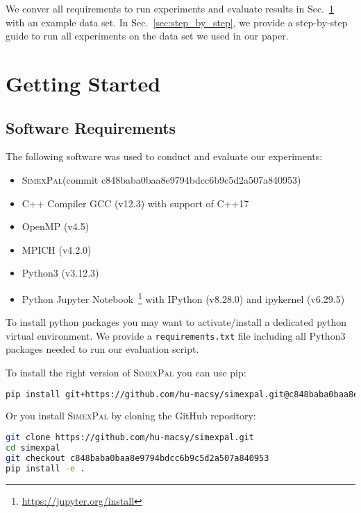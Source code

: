 \documentclass[11pt, a4paper]{scrartcl}
\newcommand{\simex}{\textsc{Simex\-Pal}\xspace}
\begin{document}
We conver all requirements to run experiments and evaluate results in
Sec.~\ref{sec:getting_started} with an example data set. In
Sec.~\ref{sec:step_by_step}, we provide a step-by-step guide to run all
experiments on the data set we used in our paper.

\newpage

\section{Getting Started}\label{sec:getting_started}

\subsection{Software Requirements}

The following software was used to conduct and evaluate our experiments:

\begin{itemize}
    \item \simex (commit c848baba0baa8e9794bdcc6b9c5d2a507a840953)
    \item C++ Compiler GCC (v12.3) with support of C++17
    \item OpenMP (v4.5)
    \item MPICH (v4.2.0)
    \item Python3 (v3.12.3)
    \item Python Jupyter Notebook~\footnote{\url{https://jupyter.org/install}}
    with IPython (v8.28.0) and ipykernel (v6.29.5)
\end{itemize}

To install python packages you may want to activate/install a dedicated python
virtual environment. We provide a \texttt{requirements.txt} file including all
Python3 packages needed to run our evaluation script.

To install the right version of \simex you can use pip:

\begin{lstlisting}[language=bash]
pip install git+https://github.com/hu-macsy/simexpal.git@c848baba0baa8e9794bdcc6b9c5d2a507a840953
\end{lstlisting}

Or you install \simex by cloning the GitHub repository:

\begin{lstlisting}[language=bash]
git clone https://github.com/hu-macsy/simexpal.git
cd simexpal
git checkout c848baba0baa8e9794bdcc6b9c5d2a507a840953
pip install -e .
\end{lstlisting}
\end{document}
